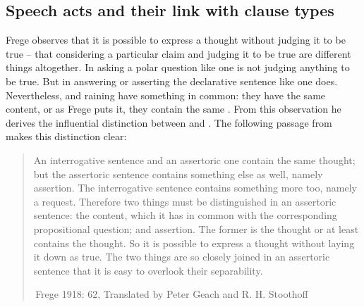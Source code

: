 \begin{comment}
Many theories assume that clauses must be ``typed,'' namely identified with their clause type category, to trigger certain operations. For example, \textcite{chomskylasnik1977} assumes that COMP must be identified with [$\pm$ wh] for verb selection purposes. Their intuition is that each clause must be identified as a declarative ($-$wh) or an interrogative (+wh). \textcite{cheng1991} formulates this intuition with the Clause Typing Hypothesis:

\begin{quote}
Every clause needs to be typed. In the case of typing a \twh-question, either a \twh-particle in $C^{0}$ is used or else fronting of a \twh-word to the Spec of $C^{0}$ is used, thereby typing a clause through $C^{0}$ by Spec-head agreement. \hfill \textcite[p.9]{cheng1991}

\end{quote}

While the specific way that a clause can be typed has been debated in the literature, people generally agree that identifying the [$\pm$ int] feature on $C_{0}$ is necessary. This means that, learners of grammar must be able to type a clause. %
\end{comment}




\subsection{Speech acts and their link with clause types} \label{sec:bg:theory:speech}
Frege observes that it is possible to express a thought without judging it to be true -- that considering a particular claim and judging it to be true are different things altogether. In asking a polar question like  one is not judging anything to be true. But in answering or asserting the declarative sentence like  one does. Nevertheless,  and  raining have something in common: they have the same content, or as Frege puts it, they contain the same . From this observation he derives the influential distinction between  and . The following passage from  makes this distinction clear:

\begin{quote}
    

An interrogative sentence and an assertoric one contain the same thought; but the assertoric sentence contains something else as well, namely assertion. The interrogative sentence contains something more too, namely a request. Therefore two things must be distinguished in an assertoric sentence: the content, which it has in common with the corresponding propositional question; and assertion. The former is the thought or at least contains the thought. So it is possible to express a thought without laying it down as true. The two things are so closely joined in an assertoric sentence that it is easy to overlook their separability. 

$\,$\hfill Frege 1918: 62, Translated by Peter Geach and R. H. Stoothoff
\end{quote}

